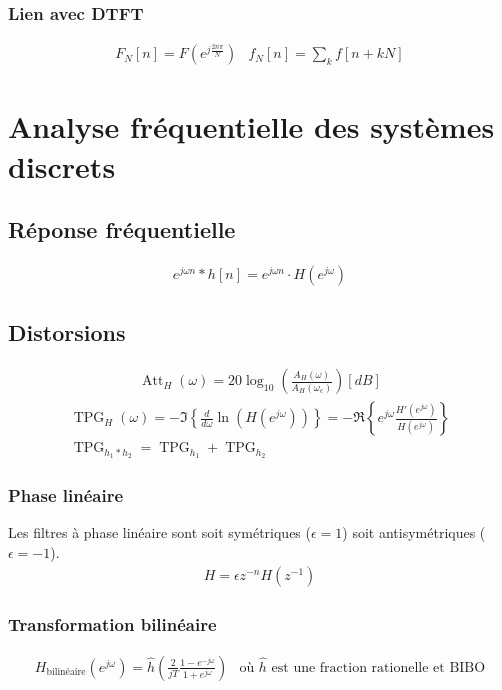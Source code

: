 \documentclass[a4paper]{amsart}
\begin{document}
\subsubsection{Lien avec DTFT}
\begin{eqnarray}
	F_N[n]=F(e^{j\frac{2n\pi}{N}})&f_N[n]=\sum_kf[n+kN]
\end{eqnarray}

\section{Analyse fréquentielle des systèmes discrets}
\subsection{Réponse fréquentielle}
\begin{eqnarray}
	e^{j\omega n}*h[n]=e^{j\omega n}\cdot H(e^{j\omega})
\end{eqnarray}

\subsection{Distorsions}
\begin{eqnarray}
	\mathop{Att}_H(\omega)=20\log_10\left(\frac{A_H(\omega)}{A_H(\omega_c)}\right) [dB]
\end{eqnarray}
\begin{eqnarray}
	\mathop{TPG}_H(\omega)=
	-\Im{\left\{\frac{d}{d\omega}\ln{\left(H(e^{j\omega})\right)}\right\}}=
	-\Re{\left\{e^{j\omega}\frac{H'(e^{j\omega})}{H(e^{j\omega})}\right\}}\\
	\mathop{TPG}_{h_1*h_2}=\mathop{TPG}_{h_1}+\mathop{TPG}_{h_2}
\end{eqnarray}

\subsubsection{Phase linéaire}
Les filtres à phase linéaire sont soit symétriques ($\epsilon=1$) soit antisymétriques ($\epsilon=-1$).
\begin{eqnarray}
	H=\epsilon z^{-n}H(z^{-1})
\end{eqnarray}
\subsubsection{Transformation bilinéaire}
\begin{eqnarray}
	H_{\text{bilinéaire}}(e^{j\omega})
	=\hat h\left(\frac{2}{jT}\frac{1-e^{-j\omega}}{1+e^{j\omega}}\right)
	&\text{où $\hat h$ est une fraction rationelle et BIBO}
\end{eqnarray}
\end{document}
